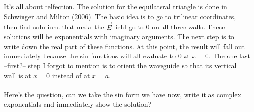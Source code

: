 \documentclass[prb,preprint]
{revtex4-1}
\begin{document}
\\
\\
It's all about relfection.  The solution for the equilateral triangle is done in Schwinger and Milton (2006).  The basic idea is to go to trilinear coordinates, then find solutions that make the $\vec{E}$ field go to 0 on all three walls.  These solutions will be exponentials with imaginary arguments.  The next step is to write down the real part of these functions.  At this point, the result will fall out immediately because the sin functions will all evaluate to 0 at $x = 0$.  The one last --first?-- step I forgot to mention is to orient the waveguide so that its vertical wall is at $x = 0$ instead of at $x = a$.
\\
\\
Here's the question, can we take the sin form we have now, write it as complex exponentials and immediately show the solution?




\end{document}
